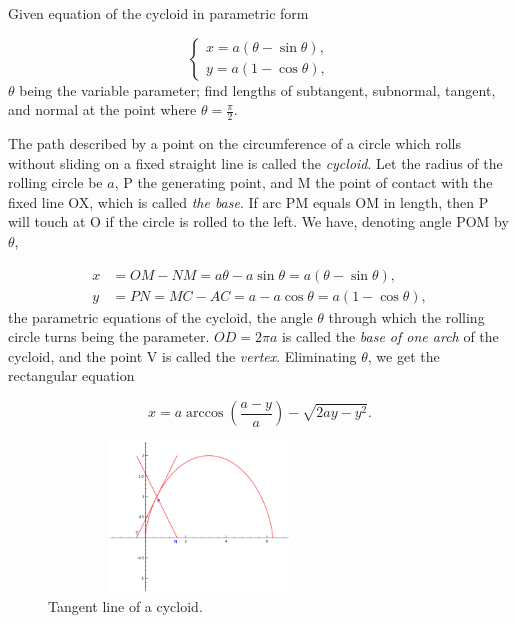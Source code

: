 \begin{example}
{\rm
Given equation of the cycloid in parametric form

\[
\begin{cases} 
x = a(\theta - \sin \theta), \\ 
y = a(1 - \cos \theta), 
\end{cases}
\]
$\theta$ being the variable parameter; 
find lengths of subtangent, subnormal, tangent, and 
normal at the point where $\theta = \frac{\pi}{2}$.

The path described by a point on the circumference of a circle 
which rolls without sliding on a fixed straight line is called 
the {\it cycloid}. 
Let the radius of the rolling circle be $a$, P the generating point, 
and M the point of contact with the fixed line OX, which is 
called {\it the base}. If arc PM equals OM in length, then 
P will touch at O if the circle is rolled to the left. 
We have, denoting angle POM by $\theta$,

\[
\begin{array}{ll}
  x &= OM - NM = a\theta - a\sin\theta = a(\theta- \sin\theta),\\  
    y &= PN = MC - AC = a - a\cos\theta = a(1 - \cos\theta),
\end{array}
\]
the parametric equations of the cycloid, the angle 
$\theta$ through which the rolling circle turns being 
the parameter. $OD = 2\pi a$ is called the {\it base of one arch} 
of the cycloid, and the point V is called the {\it vertex}. 
Eliminating $\theta$, we get the rectangular equation

\[
x = a \arccos \left ( \frac{a - y}{a} \right ) - \sqrt{ 2ay - y^2 }.
\]

\begin{figure}[h!]
\begin{minipage}{\textwidth}
\begin{center}
\includegraphics[height=4cm,width=8cm]{cycloid-tangent.eps}
\end{center}
\end{minipage}
\caption{Tangent line of a cycloid.}
\label{fig:cycloid}
\end{figure}

}
\end{example}
